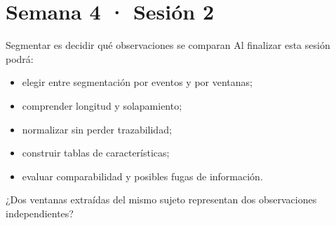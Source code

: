 \documentclass[
  ignorenonframetext,
  aspectratio=169,
  spanish,
  professionalfonts]{beamer}
\providecommand{\tightlist}{%
  \setlength{\itemsep}{0pt}\setlength{\parskip}{0pt}}
\begin{document}
\section{Semana 4 · Sesión 2}\label{semana-4-sesiuxf3n-2}

\begin{frame}{Segmentar es decidir qué observaciones se comparan}
\protect{}\label{segmentar-es-decidir-quuxe9-observaciones-se-comparan}
Al finalizar esta sesión podrá:

\begin{itemize}
\tightlist
\item
  elegir entre segmentación por eventos y por ventanas;
\item
  comprender longitud y solapamiento;
\item
  normalizar sin perder trazabilidad;
\item
  construir tablas de características;
\item
  evaluar comparabilidad y posibles fugas de información.
\end{itemize}

\begin{tcolorbox}[enhanced jigsaw, arc=.35mm, bottomrule=.15mm, bottomtitle=1mm, breakable, colback=white, colbacktitle=quarto-callout-note-color!10!white, colframe=quarto-callout-note-color-frame, coltitle=black, left=2mm, leftrule=.75mm, opacityback=0, opacitybacktitle=0.6, rightrule=.15mm, title={Pregunta inicial}, titlerule=0mm, toprule=.15mm, toptitle=1mm]

¿Dos ventanas extraídas del mismo sujeto representan dos observaciones
independientes?

\end{tcolorbox}
\end{frame}
\end{document}
